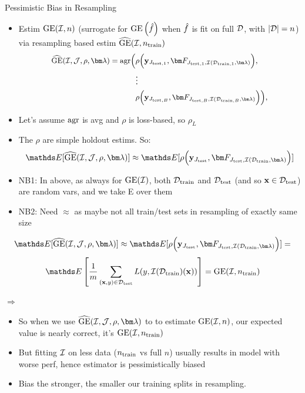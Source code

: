 \documentclass[11pt,compress,t,notes=noshow, xcolor=table]{beamer}
\begin{document}
\begin{vbframe}{Pessimistic Bias in Resampling}
\begin{itemize}
    \item Estim $\mathrm{GE}(\mathcal{I}, n)$ (surrogate for $\mathrm{GE}\left(\hat{f}\right)$ when $\hat{f}$ is fit on full $\mathcal{D}$, with $|\mathcal{D}|=n$) via resampling based estim
        $\widehat{\mathrm{GE}}(\mathcal{I}, n_{\mathrm{train}})$
\begin{equation*}
\small
\begin{split}
\GEhresa = \agr\Big(
 &\rho\Big(\yv_{\Jtesti[1]}, \FJtestftraini[1]\Big), \\ &\large{\vdots} \\
& \rho\Big(\yv_{\Jtesti[B]}, \FJtestftraini[B]\Big)
    \Big),
\end{split}
\end{equation*}
\item Let's assume $\mathrm{agr}$ is avg and $\rho$ is loss-based, so $\rho_L$ 
\item The $\rho$ are simple holdout estims. So:
$$\E[\GEhresa] \approx \E[\rho\Big(\yv_{\Jtest}, \FJtestftrain\Big)] $$
\end{itemize}

\begin{itemize}
    \footnotesize
\item NB1: In above, as always for $\mathrm{GE}(\mathcal{I})$, both $\mathcal{D}_{\text{train}}$ and $\mathcal{D}_{\text{test}}$ (and so $\mathbf{x} \in \mathcal{D}_{\text{test}}$) are random vars, and we take E over them 
\item NB2: Need $\approx$ as maybe not all train/test sets in resampling of exactly same size
\end{itemize}

\framebreak


\framebreak

$$\E[\GEhresa] \approx \E[\rho\Big(\yv_{\Jtest}, \FJtestftrain\Big)] = $$
$$  \E \left[ \frac{1}{m} \sum_{\xy \in \Dtest} L(y, \ind(\Dtrain)(\xv)) \right] = \GE(\ind, \ntrain)$$



$\Rightarrow$

\begin{itemize}
    \item So when we use $\GEhresa$ to to estimate $\mathrm{GE}(\mathcal{I}, n)$, our expected value is nearly correct, it's $\mathrm{GE}(\mathcal{I}, n_{\mathrm{train}})$
    \item But fitting $\mathcal{I}$ on less data ($n_{\mathrm{train}}$ vs full $n$) usually results in model with worse perf, hence estimator is pessimistically biased 
    \item Bias the stronger, the smaller our training splits in resampling.
\end{itemize}
\end{vbframe}
\end{document}
